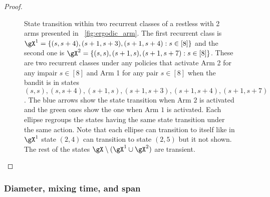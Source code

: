 \begin{proof}
\begin{figure}
        \caption{
            State transition within two recurrent classes of a restless with 2 arms presented in \figurename~\ref{fig:ergodic_arm}.
            The first recurrent class is $\gX^1 =\{(s,s+4),(s+1,s+3),(s+1,s+4): s\in[8]\}$ and the second one is $\gX^2 =\{(s,s),(s+1,s),(s+1,s+7): s\in[8]\}$.
            These are two recurrent classes under any policies that activate Arm 2 for any impair $s\in[8]$ and Arm 1 for any pair $s\in[8]$ when the bandit is in states $(s,s),(s,s+4),(s+1,s),(s+1,s+3),(s+1,s+4),(s+1,s+7)$.
            The blue arrows show the state transition when Arm $2$ is activated and the green ones show the one when Arm $1$ is activated.
            Each ellipse regroups the states having the same state transition under the same action.
            Note that each ellipse can transition to itself like in $\gX^1$ state $(2,4)$ can transition to state $(2,5)$ but it not shown.
            The rest of the states $\gX\setminus(\gX^1\cup\gX^2)$ are transient.
        }
        \label{fig:local_ergodic_multichain_RB}
    \end{figure}
\end{proof}

\subsubsection{Diameter, mixing time, and span}


